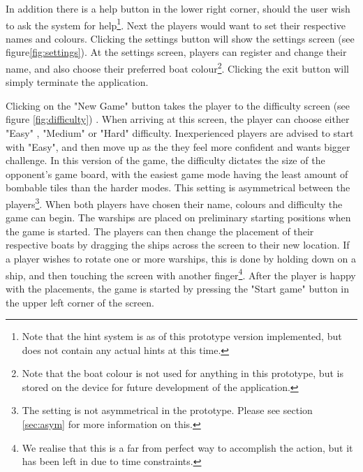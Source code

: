 In addition there is a help button in the lower right corner, should the user wish to ask the system for help\footnote{Note that the hint system is as of this prototype version implemented, but does not contain any actual hints at this time.}. 
Next the players would want to set their respective names and colours. Clicking the settings button will show the settings screen (see figure\ref{fig:settings}). At the settings screen, players can register and change their name, and also choose their preferred boat colour\footnote{Note that the boat colour is not used for anything in this prototype, but is stored on the device for future development of the application.}. 
Clicking the exit button will simply terminate the application. 

Clicking on the "New Game" button takes the player to the difficulty screen (see figure \ref{fig:difficulty}) . When arriving at this screen, the player can choose either "Easy" , "Medium" or "Hard" difficulty. Inexperienced players are advised to start with "Easy", and then move up as the they feel more confident and wants bigger challenge. 
In this version of the game, the difficulty dictates the size of the opponent's game board, with the easiest game mode having the least amount of bombable tiles than the harder modes. This setting is asymmetrical between the players\footnote{The setting is not asymmetrical in the prototype. Please see section \ref{sec:asym} for more information on this.}.
\newpage
When both players have chosen their name, colours and difficulty the game can begin. 
The warships are placed on preliminary starting positions when the game is started. The players can then change the placement of their respective boats by dragging the ships across the screen to their new location. If a player wishes to rotate one or more warships, this is done by holding down on a ship, and then touching the screen with another finger\footnote{We realise that this is a far from perfect way to accomplish the action, but it has been left in due to time constraints.}. After the player is happy with the placements, the game is started by pressing the "Start game" button in the upper left corner of the screen.

